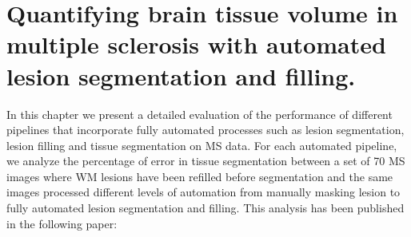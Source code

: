 
\chapter{Quantifying brain tissue volume in multiple sclerosis with automated lesion segmentation and filling.}  

\label{chapter:chapter_5}

 In this chapter we present a detailed evaluation of the performance of different pipelines that incorporate fully automated processes such as lesion segmentation, lesion filling and tissue segmentation on MS data. For each automated pipeline, we analyze the percentage of error in tissue segmentation between a set of 70 MS images where WM lesions have been refilled before segmentation and the same images processed different levels of automation from manually masking lesion to fully automated lesion segmentation and filling. This analysis has been published in the following paper:

\vspace{2cm}

\noindent{}





